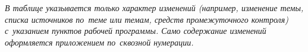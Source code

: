 \documentclass[a4paper,12pt]{article}
\begin{document}
  \medskip\noindent\textit{В таблице указывается только характер изменений (например, изменение темы, списка источников по~теме или темам, средств промежуточного контроля) с~указанием пунктов рабочей программы. Само содержание изменений оформляется приложением по~сквозной нумерации.}

\newpage\tableofcontents
\end{document}
